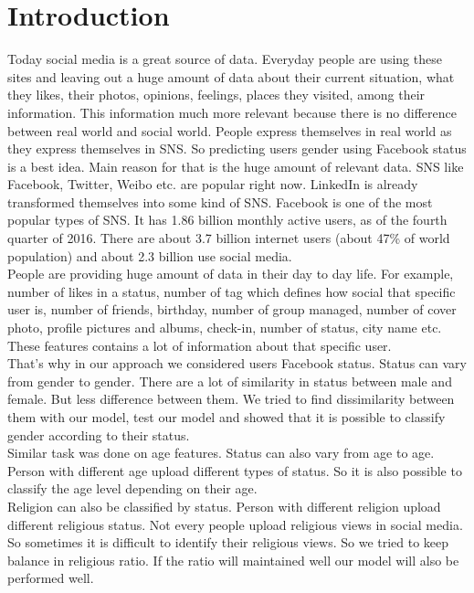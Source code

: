 \documentclass{standalone}
\begin{document}
\chapter{Introduction}
Today social media is a great source of data. Everyday people are using these sites and leaving out a huge amount of data about their current situation, what they likes, their photos, opinions, feelings, places they visited, among their information. This information much more relevant because there is no difference between real world and social world. People express themselves in real world as they express themselves in SNS. So predicting users gender using Facebook status is a best idea. Main reason for that is the huge amount of relevant data. SNS like Facebook, Twitter, Weibo etc. are popular right now. LinkedIn is already transformed themselves into some kind of SNS. Facebook is one of the most popular types of SNS. It has 1.86 billion monthly active users, as of the fourth quarter of 2016. There are about 3.7 billion internet users (about 47\% of world population) and about 2.3 billion use social media.\\
People are providing huge amount of data in their day to day life. For example, number of likes in a status, number of tag which defines how social that specific user is, number of friends, birthday, number of group managed, number of cover photo, profile pictures and albums, check-in, number of status, city name etc. These features contains a lot of information about that specific user. \\

That's why in our approach we considered users Facebook status. Status can vary from gender to gender.
There are a lot of similarity in status between male and female. But less difference between them. We tried to find dissimilarity between them with our model, test our model and showed that it is possible to classify gender according to their status.\\
Similar task was done on age features. Status can also vary from age to age. Person with different age upload different types of status. So it is also possible to classify the age level depending on their age.\\
Religion can also be classified by status. Person with different religion upload different religious status. Not every people upload religious views in social media. So sometimes it is difficult to identify their religious views. So we tried to keep balance in religious ratio. If the ratio will maintained well our model will also be performed well. \\
 
\\
\end{document}
